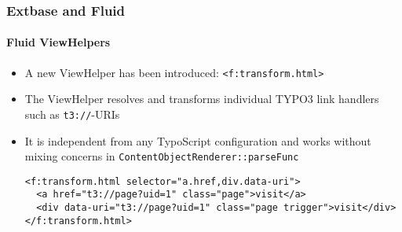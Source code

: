 %

\begin{frame}[fragile]
	\frametitle{Extbase and Fluid}
	\framesubtitle{Fluid ViewHelpers}


	\begin{itemize}
		\item A new ViewHelper has been introduced:\newline
			\small\texttt{<f:transform.html>}\normalsize
		\item The ViewHelper resolves and transforms individual TYPO3 link handlers
			such as \texttt{t3://}-URIs
		\item It is independent from any TypoScript configuration and works
			without mixing concerns in \small\texttt{ContentObjectRenderer::parseFunc}
\begin{lstlisting}
<f:transform.html selector="a.href,div.data-uri">
  <a href="t3://page?uid=1" class="page">visit</a>
  <div data-uri="t3://page?uid=1" class="page trigger">visit</div>
</f:transform.html>
\end{lstlisting}
	\end{itemize}

\end{frame}

